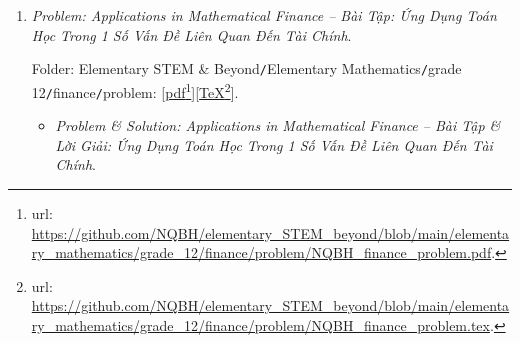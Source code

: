 \documentclass[12pt]{article}
\begin{document}
\begin{enumerate}
	Folder: {\sf Elementary STEM \& Beyond{\tt/}Elementary Mathematics{\tt/}grade 12{\tt/}optimization{\tt/}problem}: [\href{https://github.com/NQBH/elementary_STEM_beyond/blob/main/elementary_mathematics/grade_12/optimization/problem/NQBH_optimization_problem.pdf}{pdf}\footnote{{\sc url}: \url{https://github.com/NQBH/elementary_STEM_beyond/blob/main/elementary_mathematics/grade_12/optimization/problem/NQBH_optimization_problem.pdf}.}][\href{https://github.com/NQBH/elementary_STEM_beyond/blob/main/elementary_mathematics/grade_12/optimization/problem/NQBH_optimization_problem.tex}{\TeX}\footnote{{\sc url}: \url{https://github.com/NQBH/elementary_STEM_beyond/blob/main/elementary_mathematics/grade_12/optimization/problem/NQBH_optimization_problem.tex}.}].
	\begin{itemize}
		\item {\it Problem \& Solution: Mathematical Optimization -- Bài Tập \& Lời Giải: Ứng Dụng Toán Học Để Giải Quyết 1 Số Bài Toán Tối Ưu}.
		
		Folder: {\sf Elementary STEM \& Beyond{\tt/}Elementary Mathematics{\tt/}grade 12{\tt/}optimization{\tt/}solution}: [\href{https://github.com/NQBH/elementary_STEM_beyond/blob/main/elementary_mathematics/grade_12/optimization/solution/NQBH_optimization_solution.pdf}{pdf}\footnote{{\sc url}: \url{https://github.com/NQBH/elementary_STEM_beyond/blob/main/elementary_mathematics/grade_12/optimization/solution/NQBH_optimization_solution.pdf}.}][\href{https://github.com/NQBH/elementary_STEM_beyond/blob/main/elementary_mathematics/grade_12/optimization/solution/NQBH_optimization_solution.tex}{\TeX}\footnote{{\sc url}: \url{https://github.com/NQBH/elementary_STEM_beyond/blob/main/elementary_mathematics/grade_12/optimization/solution/NQBH_optimization_solution.tex}.}].
	\end{itemize}
	\item {\it Problem: Applications in Mathematical Finance -- Bài Tập: Ứng Dụng Toán Học Trong 1 Số Vấn Đề Liên Quan Đến Tài Chính}.
	
	Folder: {\sf Elementary STEM \& Beyond{\tt/}Elementary Mathematics{\tt/}grade 12{\tt/}finance{\tt/}problem}: [\href{https://github.com/NQBH/elementary_STEM_beyond/blob/main/elementary_mathematics/grade_12/finance/problem/NQBH_finance_problem.pdf}{pdf}\footnote{{\sc url}: \url{https://github.com/NQBH/elementary_STEM_beyond/blob/main/elementary_mathematics/grade_12/finance/problem/NQBH_finance_problem.pdf}.}][\href{https://github.com/NQBH/elementary_STEM_beyond/blob/main/elementary_mathematics/grade_12/finance/problem/NQBH_finance_problem.tex}{\TeX}\footnote{{\sc url}: \url{https://github.com/NQBH/elementary_STEM_beyond/blob/main/elementary_mathematics/grade_12/finance/problem/NQBH_finance_problem.tex}.}].
	\begin{itemize}
		\item {\it Problem \& Solution: Applications in Mathematical Finance -- Bài Tập \& Lời Giải: Ứng Dụng Toán Học Trong 1 Số Vấn Đề Liên Quan Đến Tài Chính}.
		

\end{itemize}
\end{enumerate}
\end{document}
